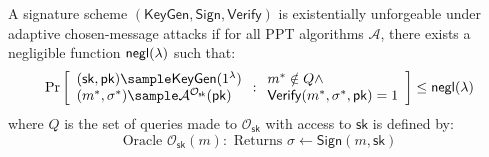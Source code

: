 \begin{definition}
A signature scheme $(\mathsf{KeyGen}, \mathsf{Sign}, \mathsf{Verify})$ is existentially unforgeable under adaptive chosen-message attacks if for all PPT algorithms $\mathcal{A}$, there exists a negligible function ${\mathsf{negl}(\lambda)}$ such that:
$$\Pr\left[\begin{array}{l}
    (\mathsf{sk}, \mathsf{pk}) \sample \mathsf{KeyGen}(1^\lambda) \\
    (m^*, \sigma^*) \sample \mathcal{A}^{\mathcal{O}_{\mathsf{sk}}}(\mathsf{pk})
\end{array} : \begin{array}{l}
    m^* \notin Q \land \\
    \mathsf{Verify}(m^*, \sigma^*, \mathsf{pk}) = 1
\end{array}\right] \leq \negl$$
where $Q$ is the set of queries made to $\mathcal{O}_{\mathsf{sk}}$ with access to $\mathsf{sk}$ is defined by:
\[
\text{Oracle }\mathcal{O}_{\mathsf{sk}}(m): \text{ Returns } \sigma \gets \mathsf{Sign}(m, \mathsf{sk})
\]
\end{definition}





% 
% 


























% 
% 


\newpage
